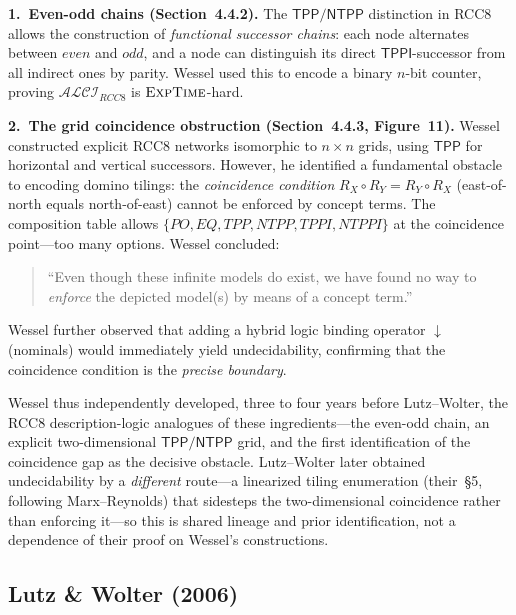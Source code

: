 \documentclass[
]{ceurart}
\theoremstyle{definition}
\newcommand{\ALCIRCC}[1]{\ensuremath{\mathcal{ALCI}_{\mathit{RCC#1}}}}
\newcommand{\TPP}{\ensuremath{\mathsf{TPP}}}
\newcommand{\NTPP}{\ensuremath{\mathsf{NTPP}}}
\newcommand{\TPPI}{\ensuremath{\mathsf{TPPI}}}
\newcommand{\EXPTIME}{\textsc{ExpTime}}
\begin{document}
\medskip\noindent\textbf{1.\ Even-odd chains (Section~4.4.2).}
The $\TPP/\NTPP$ distinction in RCC8 allows the construction of
\emph{functional successor chains}: each node alternates between
$\mathit{even}$ and $\mathit{odd}$, and a node can distinguish its
direct $\TPPI$-successor from all indirect ones by parity.
Wessel used this to encode a binary $n$-bit counter, proving
$\ALCIRCC{8}$ is $\EXPTIME$-hard.

\medskip\noindent\textbf{2.\ The grid coincidence obstruction (Section~4.4.3,
Figure~11).}
Wessel constructed explicit RCC8 networks isomorphic to
$n \times n$ grids, using $\TPP$ for horizontal and vertical
successors.  However, he identified a fundamental obstacle to
encoding domino tilings: the \emph{coincidence condition}
$R_X \circ R_Y = R_Y \circ R_X$ (east-of-north equals
north-of-east) cannot be enforced by concept terms.
The composition table allows $\{PO, EQ, TPP, NTPP, TPPI, NTPPI\}$
at the coincidence point---too many options.  Wessel concluded:
\begin{quote}
``Even though these infinite models do exist, we have found no way
to \emph{enforce} the depicted model(s) by means of a concept term.''
\end{quote}
Wessel further observed that adding a hybrid logic binding operator
$\downarrow$ (nominals) would immediately yield undecidability,
confirming that the coincidence condition is the \emph{precise
boundary}.

Wessel thus independently developed, three to four years before
Lutz--Wolter, the RCC8 description-logic analogues of these
ingredients---the even-odd chain, an explicit two-dimensional
$\TPP/\NTPP$ grid, and the first identification of the coincidence
gap as the decisive obstacle.  Lutz--Wolter later obtained
undecidability by a \emph{different} route---a linearized tiling
enumeration (their~\S5, following Marx--Reynolds) that sidesteps the
two-dimensional coincidence rather than enforcing it---so this is
shared lineage and prior identification, not a dependence of their
proof on Wessel's constructions.

\subsection{Lutz \& Wolter (2006)}
\end{document}

